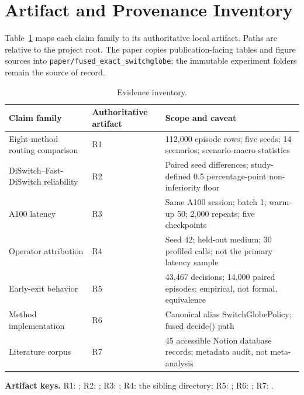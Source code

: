 \documentclass[drones,article,submit,moreauthors]{Definitions/mdpi}
\begin{document}
\section{Artifact and Provenance Inventory}

Table~\ref{tab:inventory} maps each claim family to its authoritative local artifact. Paths are relative to the project root. The paper copies publication-facing tables and figure sources into \texttt{paper/fused\_exact\_switchglobe}; the immutable experiment folders remain the source of record.

\begin{table}[H]
\caption{Evidence inventory.}\label{tab:inventory}\small
\begin{tabularx}{\textwidth}{p{}p{}X}
\toprule
Claim family & Authoritative artifact & Scope and caveat \\
\midrule
Eight-method routing comparison & R1 & 112,000 episode rows; five seeds; 14 scenarios; scenario-macro statistics \\
DiSwitch--Fast-DiSwitch reliability & R2 & Paired seed differences; study-defined 0.5 percentage-point non-inferiority floor \\
A100 latency & R3 & Same A100 session; batch 1; warm-up 50; 2,000 repeats; five checkpoints \\
Operator attribution & R4 & Seed 42; held-out medium; 30 profiled calls; not the primary latency sample \\
Early-exit behavior & R5 & 43,467 decisions; 14,000 paired episodes; empirical, not formal, equivalence \\
Method implementation & R6 & Canonical alias SwitchGlobePolicy; fused decide() path \\
Literature corpus & R7 & 45 accessible Notion database records; metadata audit, not meta-analysis \\
\bottomrule
\end{tabularx}
\end{table}

\noindent\textbf{Artifact keys.} R1: ; R2: ; R3: ; R4: the sibling  directory; R5: ; R6: ; R7: .
\end{document}
